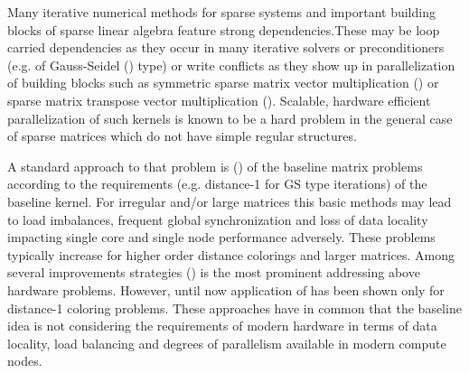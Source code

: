 Many iterative numerical methods for sparse systems and important building blocks of sparse linear algebra feature strong dependencies.These may be loop carried dependencies as they occur in many iterative solvers or preconditioners (e.g. of Gauss-Seidel (\GS) type) or write conflicts as they show up in parallelization of building blocks such as symmetric sparse matrix vector multiplication (\SymmSpmv) or sparse matrix transpose vector multiplication (\SpMTV). Scalable, hardware efficient parallelization of such kernels is known to be a hard problem in the general case of sparse matrices which do not have simple regular structures.

A standard approach to that problem is \MCfull (\MC) of the baseline matrix problems according to the requirements (e.g. distance-1 for GS type iterations) of the baseline kernel. For irregular and/or large matrices this basic methods may lead to load imbalances, frequent global synchronization and loss of data locality impacting single core and single node performance adversely. These problems typically increase for higher order distance colorings and larger matrices. Among several improvements strategies \ABMCfull (\ABMC) is the most prominent addressing above hardware problems. However, until now application of \ABMC has been shown only for distance-1 coloring problems. These approaches have in common that the baseline idea is not considering the requirements of modern hardware in terms of data locality, load balancing and degrees of parallelism available in modern compute nodes.

